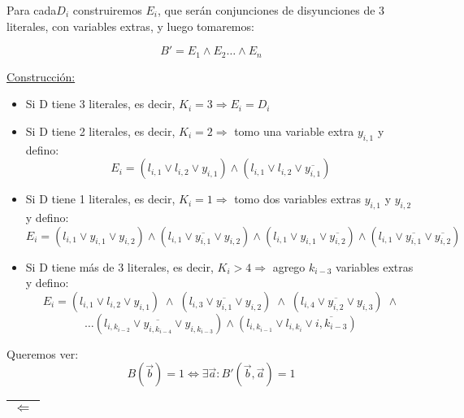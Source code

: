 \documentclass[12pt,a4paper]{report}
\begin{document}
		Para cada$D_{i}$ construiremos $E_{i}$, que serán conjunciones de disyunciones de 3 literales, con variables extras, y luego tomaremos:

		\[ B' = E_{1} \wedge E_{2} \dotsc \wedge E_{n} \]

		\underline{Construcción:}
		\begin{itemize}
			\item Si D tiene 3 literales, es decir, $K_{i} = 3 \Rightarrow E_{i} = D_{i}$
			\item Si D tiene 2 literales, es decir, $K_{i} = 2 \Rightarrow$ tomo una variable extra $y_{i, 1}$ y defino:
				\[ E_{i} = (l_{i, 1} \vee l_{i, 2} \vee y_{i, 1}) \wedge (l_{i, 1} \vee l_{i, 2} \vee \overline{y_{i, 1}}) \]
			\item Si D tiene 1 literales, es decir, $K_{i} = 1 \Rightarrow$ tomo dos variables extras $y_{i, 1}$ y $y_{i, 2}$ y defino:
				\[ E_{i} = (l_{i, 1} \vee y_{i, 1} \vee y_{i, 2}) \wedge (l_{i, 1} \vee \overline{y_{i, 1}} \vee y_{i, 2}) \wedge (l_{i, 1} \vee y_{i, 1} \vee \overline{y_{i, 2}}) \wedge (l_{i, 1} \vee \overline{y_{i, 1}} \vee \overline{y_{i, 2}}) \]
			\item Si D tiene más de 3 literales, es decir, $K_{i} > 4 \Rightarrow$ agrego $k_{i-3}$ variables extras y defino:
				\[ E_{i} = (l_{i, 1} \vee l_{i, 2} \vee y_{i, 1}) \; \wedge \; (l_{i, 3} \vee \overline{y_{i, 1}} \vee y_{i, 2}) \; \wedge \; (l_{i, 4} \vee \overline{y_{i, 2}} \vee y_{i, 3}) \; \wedge \]
				\[ \dotsc (l_{i, k_{i-2}} \vee \overline{y_{i, k_{i-4}}} \vee y_{i, k_{i-3}}) \wedge (l_{i, k_{i-1}} \vee l_{i, k_{i}} \vee \overline{i, k_{i-3}}) \]
		\end{itemize}

		Queremos ver:
		\[ B(\overrightarrow{b}) = 1 \Leftrightarrow \exists \overrightarrow{a} : B'(\overrightarrow{b}, \overrightarrow{a}) = 1 \]

		\vspace{5mm}
		\begin{tabular}{|c|} \hline $\Leftarrow$ \\ \hline \end{tabular}
\end{document}

